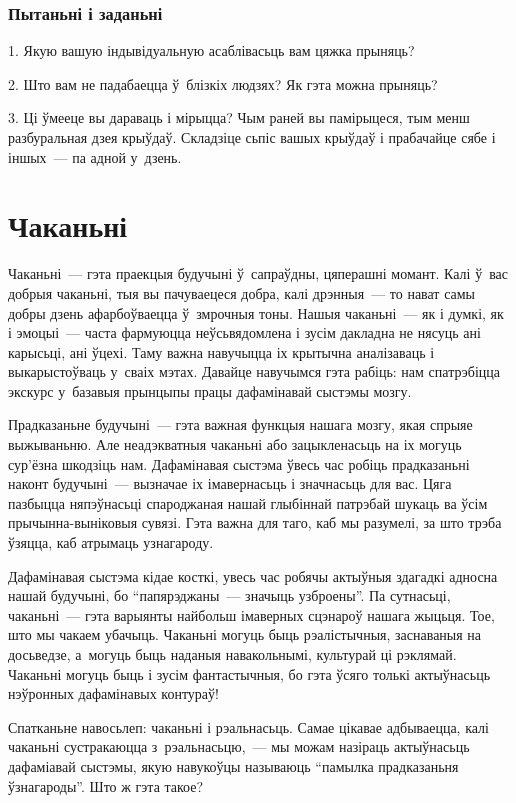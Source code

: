 \subsubsection{Пытаньні і заданьні}

1. Якую вашую індывідуальную асаблівасьць вам цяжка прыняць?

2. Што вам не падабаецца ў~блізкіх людзях? Як гэта можна прыняць?

3. Ці ўмееце вы дараваць і мірыцца? Чым раней вы памірыцеся, тым менш разбуральная дзея крыўдаў. Складзіце сьпіс вашых крыўдаў і прабачайце сябе і іншых~--- па адной у~дзень.


\section{Чаканьні}

Чаканьні~--- гэта праекцыя будучыні ў~сапраўдны, цяперашні момант. Калі ў~вас добрыя чаканьні, тыя вы пачуваецеся добра, калі дрэнныя~--- то нават самы добры дзень афарбоўваецца ў~змрочныя тоны. Нашыя чаканьні~--- як і думкі, як і эмоцыі~--- часта фармуюцца неўсьвядомлена і зусім дакладна не нясуць ані карысьці, ані ўцехі. Таму важна навучыцца іх крытычна аналізаваць і выкарыстоўваць у~сваіх мэтах. Давайце навучымся гэта рабіць: нам спатрэбіцца экскурс у~базавыя прынцыпы працы дафамінавай сыстэмы мозгу.

Прадказаньне будучыні~--- гэта важная функцыя нашага мозгу, якая спрыяе выжываньню. Але неадэкватныя чаканьні або зацыкленасьць на іх могуць сур'ёзна шкодзіць нам. Дафамінавая сыстэма ўвесь час робіць прадказаньні наконт будучыні~--- вызначае іх імавернасьць і значнасьць для вас. Цяга пазбыцца няпэўнасьці спароджаная нашай глыбіннай патрэбай шукаць ва ўсім прычынна-выніковыя сувязі. Гэта важна для таго, каб мы разумелі, за што трэба ўзяцца, каб атрымаць узнагароду.

Дафамінавая сыстэма кідае косткі, увесь час робячы актыўныя здагадкі адносна нашай будучыні, бо ``папярэджаны~--- значыць узброены''. Па сутнасьці, чаканьні~--- гэта варыянты найбольш імаверных сцэнароў нашага жыцьця. Тое, што мы чакаем убачыць. Чаканьні могуць быць рэалістычныя, заснаваныя на досьведзе, а~могуць быць наданыя навакольнымі, культурай ці рэклямай. Чаканьні могуць быць і зусім фантастычныя, бо гэта ўсяго толькі актыўнасьць нэўронных дафамінавых контураў!

Спатканьне навосьлеп: чаканьні і рэальнасьць. Самае цікавае адбываецца, калі чаканьні сустракаюцца з~рэальнасьцю,~--- мы можам назіраць актыўнасьць дафаміавай сыстэмы, якую навукоўцы называюць ``памылка прадказаньня ўзнагароды''. Што ж гэта такое?

